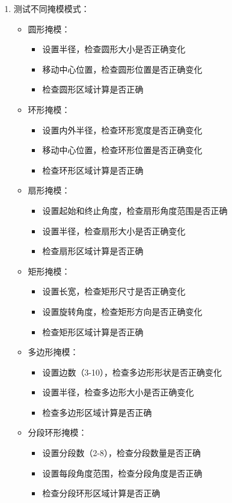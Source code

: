 \documentclass[a4paper,12pt]{report}	%
\begin{document}
\begin{enumerate}
    \item 测试不同掩模模式：
    \begin{itemize}
        \item 圆形掩模：
        \begin{itemize}
            \item 设置半径，检查圆形大小是否正确变化
            \item 移动中心位置，检查圆形位置是否正确变化
            \item 检查圆形区域计算是否正确
        \end{itemize}
        \item 环形掩模：
        \begin{itemize}
            \item 设置内外半径，检查环形宽度是否正确变化
            \item 移动中心位置，检查环形位置是否正确变化
            \item 检查环形区域计算是否正确
        \end{itemize}
        \item 扇形掩模：
        \begin{itemize}
            \item 设置起始和终止角度，检查扇形角度范围是否正确
            \item 设置半径，检查扇形大小是否正确变化
            \item 检查扇形区域计算是否正确
        \end{itemize}
        \item 矩形掩模：
        \begin{itemize}
            \item 设置长宽，检查矩形尺寸是否正确变化
            \item 设置旋转角度，检查矩形方向是否正确变化
            \item 检查矩形区域计算是否正确
        \end{itemize}
        \item 多边形掩模：
        \begin{itemize}
            \item 设置边数（3-10），检查多边形形状是否正确变化
            \item 设置半径，检查多边形大小是否正确变化
            \item 检查多边形区域计算是否正确
        \end{itemize}
        \item 分段环形掩模：
        \begin{itemize}
            \item 设置分段数（2-8），检查分段数量是否正确
            \item 设置每段角度范围，检查分段角度是否正确
            \item 检查分段环形区域计算是否正确
        \end{itemize}
    \end{itemize}


\end{enumerate}
\end{document}

